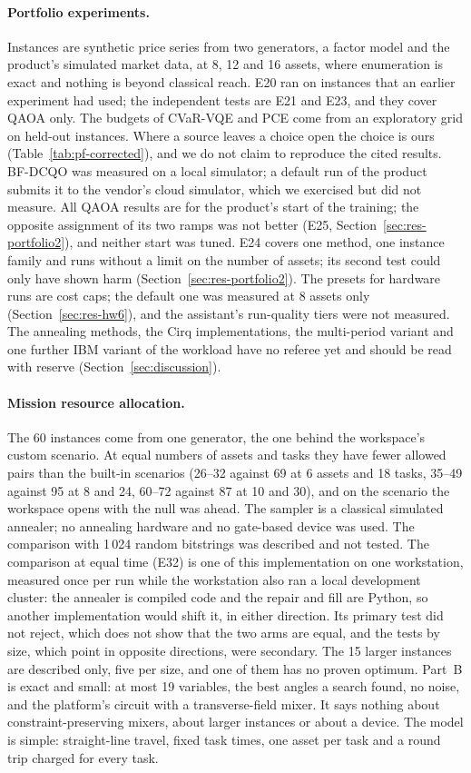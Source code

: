 \documentclass[11pt,a4paper]{article}
\begin{document}
\paragraph{Portfolio experiments.} Instances are synthetic price series from
two generators, a factor model and the product's simulated market data, at
8, 12 and 16 assets, where enumeration is exact and nothing is beyond
classical reach. E20 ran on instances that an earlier experiment had used; the
independent tests are E21 and E23, and they cover QAOA only. The budgets of
CVaR-VQE and PCE come from an exploratory grid on held-out instances. Where
a source leaves a choice open the choice is ours
(Table~\ref{tab:pf-corrected}), and we do not claim to reproduce the cited
results. BF-DCQO was measured on a local simulator; a default run of the
product submits it to the vendor's cloud simulator, which we exercised but
did not measure. All QAOA
results are for the product's start of the training; the opposite
assignment of its two ramps was not better (E25, Section~\ref{sec:res-portfolio2}), and
neither start was tuned. E24 covers one method, one instance
family and runs without a limit on the number of assets; its second test
could only have shown harm (Section~\ref{sec:res-portfolio2}). The presets
for hardware runs are cost caps; the default one was measured at 8 assets
only (Section~\ref{sec:res-hw6}), and the assistant's
run-quality tiers were not measured. The annealing methods, the Cirq
implementations, the multi-period variant and one further IBM variant of the
workload have no referee yet and should be read with reserve
(Section~\ref{sec:discussion}).

\paragraph{Mission resource allocation.} The 60 instances come from one
generator, the one behind the workspace's custom scenario. At equal numbers
of assets and tasks they have fewer allowed pairs than the built-in
scenarios (26--32 against 69 at 6 assets and 18 tasks, 35--49 against 95 at
8 and 24, 60--72 against 87 at 10 and 30), and on the scenario the workspace
opens with the null was ahead. The sampler is a classical simulated
annealer; no annealing hardware and no gate-based device was used. The
comparison with 1\,024 random bitstrings was described and not tested.
The comparison at equal time (E32) is one of this implementation on one
workstation, measured once per run while the workstation also ran a local
development cluster: the annealer is compiled code and the repair and fill
are Python, so another implementation would shift it, in either direction.
Its primary test did not reject, which does not show that the two arms are
equal, and the tests by size, which point in opposite directions, were
secondary. The 15 larger instances are described only, five per size, and
one of them has no proven optimum. Part~B is exact and small: at most 19 variables, the best angles
a search found, no noise, and the platform's circuit with a transverse-field
mixer. It says nothing about constraint-preserving mixers, about larger
instances or about a device. The model is simple: straight-line travel,
fixed task times, one asset per task and a round trip charged for every
task.
\end{document}
